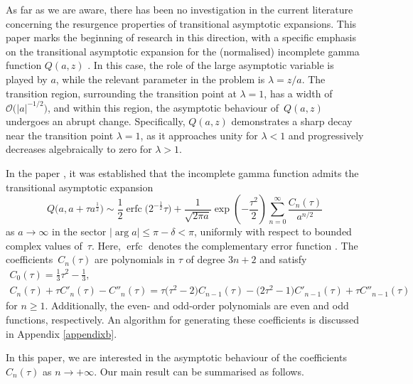 \documentclass[11pt]{article}
\numberwithin{equation}{section}
\def\erfc{\operatorname{erfc}}
\numberwithin{equation}{section}
\begin{document}
As far as we are aware, there has been no investigation in the current literature concerning the resurgence properties of transitional asymptotic expansions. This paper marks the beginning of research in this direction, with a specific emphasis on the transitional asymptotic expansion for the (normalised) incomplete gamma function $Q(a, z)$ \cite[Section~8.2\,(i)]{DLMF}. In this case, the role of the large asymptotic variable is played by $a$, while the relevant parameter in the problem is $\lambda=z/a$. The transition region, surrounding the transition point at $\lambda=1$, has a width of~$\mathcal{O}\big(|a|^{-1/2}\big)$, and within this region, the asymptotic behaviour of~$Q(a,z)$ undergoes an abrupt change. Specifically, $Q(a,z)$ demonstrates a sharp decay near the transition point $\lambda=1$, as it approaches unity for $\lambda<1$ and progressively decreases algebraically to zero for $\lambda>1$.

In the paper \cite{Nemes2019}, it was established that the incomplete gamma function admits the transitional asymptotic expansion
\begin{equation}\label{eq2}
Q\big(a,a+\tau a^{\frac{1}{2}}\big) \sim \frac{1}{2} \erfc\big(2^{-\frac{1}{2}}\tau\big) + \frac{1}{\sqrt {2\pi a}}
\exp\left(-\frac{\tau^2}{2}\right) \sum_{n=0}^\infty\frac{C_n(\tau)}{a^{n/2}}
\end{equation}
as $a\to \infty$ in the sector $|\arg a| \le \pi-\delta<\pi$, uniformly with respect to bounded complex values of~$\tau$. Here, $\erfc$ denotes the complementary error function \cite[equation~(2.2)]{DLMF}. The coefficients~$C_n(\tau)$ are polynomials in $\tau$ of degree $3n+2$ and satisfy
\begin{gather}
C_0 (\tau ) = \frac{1}{3}\tau^2-\frac{1}{3},\nonumber\\
C_n (\tau ) + \tau C'_n (\tau ) - C''_n (\tau ) = \tau \big(\tau ^2 - 2\big)C_{n - 1} (\tau ) - \big(2\tau^2 - 1\big)C'_{n - 1} (\tau ) + \tau C''_{n - 1} (\tau )\label{eq32}
\end{gather}
for $n\geq 1$. Additionally, the even- and odd-order polynomials are even and odd functions, respectively. An algorithm for generating these coefficients is discussed in Appendix \ref{appendixb}.

In this paper, we are interested in the asymptotic behaviour of the coefficients $C_n(\tau)$ as $n\to+\infty$. Our main result can be summarised as follows.
\end{document}
